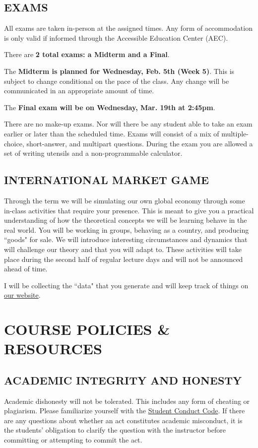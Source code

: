 \documentclass[11pt]{article}
\begin{document}
\subsection*{EXAMS}
All exams are taken in-person at the assigned times. 
Any form of accommodation is only valid if informed through the Accessible Education Center (AEC).

There are \textbf{2 total exams: a Midterm and a Final}. 

The \textbf{Midterm is planned for Wednesday, Feb. 5th (Week 5)}. 
This is subject to change conditional on the pace of the class.
Any change will be communicated in an appropriate amount of time. 

The \textbf{Final exam will be on Wednesday, Mar. 19th at 2:45pm}.

There are no make-up exams. 
Nor will there be any student able to take an exam earlier or later than the scheduled time. 
Exams will consist of a mix of multiple-choice, short-answer, and multipart questions. 
During the exam you are allowed a set of writing utensils and a non-programmable calculator. 

\subsection*{INTERNATIONAL MARKET GAME}

Through the term we will be simulating our own global economy through some in-class activities that require your presence.   
This is meant to give you a practical understanding of how the theoretical concepts we will be learning behave in the real world. 
You will be working in groups, behaving as a country, and producing ``goods" for sale.
We will introduce interesting circumstances and dynamics that will challenge our theory and that you will adapt to. 
These activities will take place during the second half of regular lecture days and will not be announced ahead of time. 

I will be collecting the ``data" that you generate and will keep track of things on \href{https://jrojas1003.github.io/EC-380-Intl-Econ-Issues/Activities/activities.html}{our website}.

\bigskip \bigskip 

\section*{COURSE POLICIES \& RESOURCES}

\subsection*{ACADEMIC INTEGRITY AND HONESTY}
Academic dishonesty will not be tolerated.
This includes any form of cheating or plagiarism.
Please familiarize yourself with the \href{https://policies.uoregon.edu/vol-3-administration-student-affairs/ch-1-conduct/student-conduct-code}{Student Conduct Code}.
If there are any questions about whether an act constitutes academic misconduct, it is the students' obligation to clarify the question with the instructor before committing or attempting to commit the act.
\end{document}
